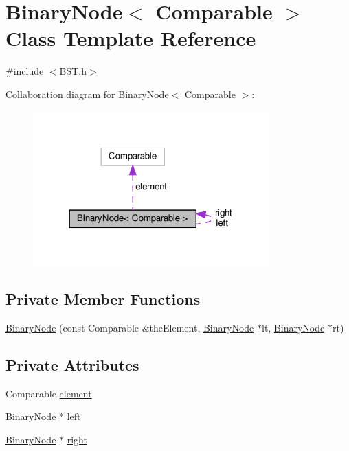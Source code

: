 \hypertarget{classBinaryNode}{}\section{Binary\+Node$<$ Comparable $>$ Class Template Reference}
\label{classBinaryNode}


{\ttfamily \#include $<$B\+S\+T.\+h$>$}



Collaboration diagram for Binary\+Node$<$ Comparable $>$\+:\nopagebreak
\begin{figure}[H]
\begin{center}
\leavevmode
\includegraphics[width=258pt]{classBinaryNode__coll__graph}
\end{center}
\end{figure}
\subsection*{Private Member Functions}
\begin{DoxyCompactItemize}
\item 
\hyperlink{classBinaryNode_aff89d3679c077d70b67ad16e9816d884}{Binary\+Node} (const Comparable \&the\+Element, \hyperlink{classBinaryNode}{Binary\+Node} $\ast$lt, \hyperlink{classBinaryNode}{Binary\+Node} $\ast$rt)
\end{DoxyCompactItemize}
\subsection*{Private Attributes}
\begin{DoxyCompactItemize}
\item 
Comparable \hyperlink{classBinaryNode_a75804c1624577ae485b775408b54bd06}{element}
\item 
\hyperlink{classBinaryNode}{Binary\+Node} $\ast$ \hyperlink{classBinaryNode_a2b6352b5519f90f2d9c2d610b2278dac}{left}
\item 
\hyperlink{classBinaryNode}{Binary\+Node} $\ast$ \hyperlink{classBinaryNode_a847342c242923f34b77fc5e402fbbb4b}{right}
\end{DoxyCompactItemize}
